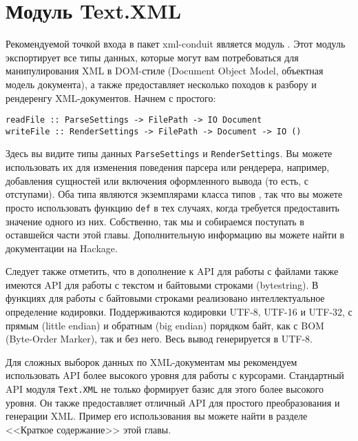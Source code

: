 \section{Модуль Text.XML}

Рекомендуемой точкой входа в пакет xml-conduit является модуль . Этот модуль экспортирует все типы данных, которые могут вам потребоваться для манипулирования XML в DOM-стиле (Document Object Model, объектная модель документа), а также предоставляет несколько походов к разбору и рендеренгу XML-документов. Начнем с простого:

\begin{lstlisting}
readFile :: ParseSettings -> FilePath -> IO Document
writeFile :: RenderSettings -> FilePath -> Document -> IO ()
\end{lstlisting}

Здесь вы видите типы данных \lstinline!ParseSettings! и \lstinline!RenderSettings!. Вы можете использовать их для изменения поведения парсера или рендерера, например, добавления сущностей или включения оформленного вывода (то есть, с отступами). Оба типа являются экземплярами класса типов , так что вы можете просто использовать функцию \lstinline!def! в тех случаях, когда требуется предоставить значение одного из них. Собственно, так мы и собираемся поступать в оставшейся части этой главы. Дополнительную информацию вы можете найти в документации на Hackage.

Следует также отметить, что в дополнение к API для работы с файлами также имеются API для работы с текстом и байтовыми строками (bytestring). В функциях для работы с байтовыми строками реализовано интеллектуальное определение кодировки. Поддерживаются кодировки UTF-8, UTF-16 и UTF-32, с прямым (little endian) и обратным (big endian) порядком байт, как с BOM (Byte-Order Marker), так и без него. Весь вывод генерируется в UTF-8.

Для сложных выборок данных по XML-документам мы рекомендуем использовать API более высокого уровня для работы с курсорами. Стандартный API модуля \lstinline!Text.XML! не только формирует базис для этого более высокого уровня. Он также предоставляет отличный API для простого преобразования и генерации XML. Пример его использования вы можете найти в разделе <<Краткое содержание>> этой главы.

